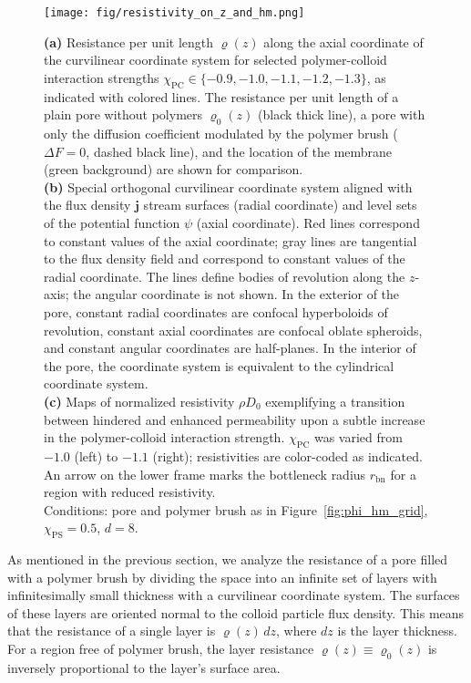 \documentclass[12pt, a4paper]{article}
\begin{document}
\begin{figure}
    \centering
    \texttt{[image: fig/resistivity\_on\_z\_and\_hm.png]}
    \caption{
    \textbf{(a)} Resistance per unit length $\varrho(z)$ along the axial coordinate of the curvilinear coordinate system for selected polymer-colloid interaction strengths $\chi_{\text{PC}} \in \{ -0.9, -1.0, -1.1, -1.2, -1.3\}$, as indicated with colored lines.
    The resistance per unit length of a plain pore without polymers $\varrho_{0}(z)$ (black thick line), a pore with only the diffusion coefficient modulated by the polymer brush ($\Delta F = 0$, dashed black line), and the location of the membrane (green background) are shown for comparison.
    \\
    \textbf{(b)} Special orthogonal curvilinear coordinate system aligned with the flux density $\bm{j}$ stream surfaces (radial coordinate) and level sets of the potential function $\psi$ (axial coordinate).
    Red lines correspond to constant values of the axial coordinate; gray lines are tangential to the flux density field and correspond to constant values of the radial coordinate.
    The lines define bodies of revolution along the $z$-axis; the angular coordinate is not shown.
    In the exterior of the pore, constant radial coordinates are confocal hyperboloids of revolution, constant axial coordinates are confocal oblate spheroids, and constant angular coordinates are half-planes.
    In the interior of the pore, the coordinate system is equivalent to the cylindrical coordinate system.
    \\
    \textbf{(c)} Maps of normalized resistivity $\rho D_0$ exemplifying a transition between hindered and enhanced permeability upon a subtle increase in the polymer-colloid interaction strength.
    $\chi_{\text{PC}}$ was varied from $-1.0$ (left) to $-1.1$ (right); resistivities are color-coded as indicated.
    An arrow on the lower frame marks the bottleneck radius $r_{\text{bn}}$ for a region with reduced resistivity.\\
    Conditions: pore and polymer brush as in Figure~\ref{fig:phi_hm_grid}, $\chi_{\text{PS}}=0.5$, $d=8$.
    }
    \label{fig:R_map}
\end{figure}

As mentioned in the previous section, we analyze the resistance of a pore filled with a polymer brush by dividing the space into an infinite set of layers with infinitesimally small thickness with a curvilinear coordinate system.
The surfaces of these layers are oriented normal to the colloid particle flux density.
This means that the resistance of a single layer is $\varrho(z) \, dz$, where $dz$ is the layer thickness.
For a region free of polymer brush, the layer resistance $\varrho(z) \equiv \varrho_{0}(z)$ is inversely proportional to the layer's surface area.
\end{document}
